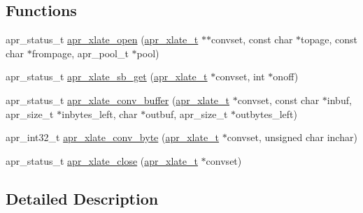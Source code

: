 \subsection*{Functions}
\begin{DoxyCompactItemize}
\item 
apr\-\_\-status\-\_\-t \hyperlink{group___a_p_r___x_l_a_t_e_gab7d55348056d7e4cadbc35cfb8e1e624}{apr\-\_\-xlate\-\_\-open} (\hyperlink{group___a_p_r___x_l_a_t_e_ga069dabbadc30e3a4157c38104a250e77}{apr\-\_\-xlate\-\_\-t} $\ast$$\ast$convset, const char $\ast$topage, const char $\ast$frompage, apr\-\_\-pool\-\_\-t $\ast$pool)
\item 
apr\-\_\-status\-\_\-t \hyperlink{group___a_p_r___x_l_a_t_e_ga578875b2e6b2a19f8466b80e0768792e}{apr\-\_\-xlate\-\_\-sb\-\_\-get} (\hyperlink{group___a_p_r___x_l_a_t_e_ga069dabbadc30e3a4157c38104a250e77}{apr\-\_\-xlate\-\_\-t} $\ast$convset, int $\ast$onoff)
\item 
apr\-\_\-status\-\_\-t \hyperlink{group___a_p_r___x_l_a_t_e_gab92a20b644aa78ca94c6147b254a54f1}{apr\-\_\-xlate\-\_\-conv\-\_\-buffer} (\hyperlink{group___a_p_r___x_l_a_t_e_ga069dabbadc30e3a4157c38104a250e77}{apr\-\_\-xlate\-\_\-t} $\ast$convset, const char $\ast$inbuf, apr\-\_\-size\-\_\-t $\ast$inbytes\-\_\-left, char $\ast$outbuf, apr\-\_\-size\-\_\-t $\ast$outbytes\-\_\-left)
\item 
apr\-\_\-int32\-\_\-t \hyperlink{group___a_p_r___x_l_a_t_e_ga90173cefe2dee6e5032ff17b15fea14b}{apr\-\_\-xlate\-\_\-conv\-\_\-byte} (\hyperlink{group___a_p_r___x_l_a_t_e_ga069dabbadc30e3a4157c38104a250e77}{apr\-\_\-xlate\-\_\-t} $\ast$convset, unsigned char inchar)
\item 
apr\-\_\-status\-\_\-t \hyperlink{group___a_p_r___x_l_a_t_e_ga2f88b0f72cd2512b8002344308480a8f}{apr\-\_\-xlate\-\_\-close} (\hyperlink{group___a_p_r___x_l_a_t_e_ga069dabbadc30e3a4157c38104a250e77}{apr\-\_\-xlate\-\_\-t} $\ast$convset)
\end{DoxyCompactItemize}


\subsection{Detailed Description}


